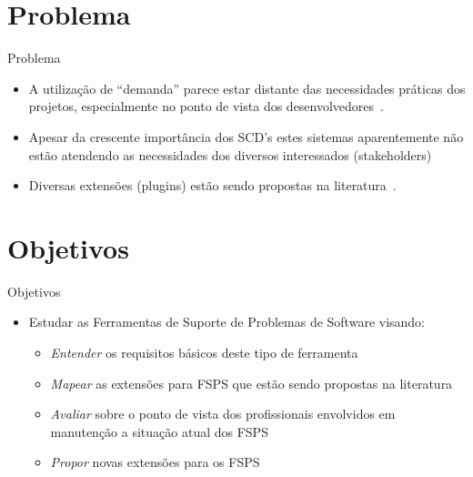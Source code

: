 \documentclass[t,14pt,mathserif]{beamer}
\begin{document}
\section{Problema}

\begin{frame}{Problema}
	\begin{itemize}
        \item A utilização de  ``demanda'' parece estar distante das
            necessidades práticas dos projetos, especialmente no ponto de vista
            dos desenvolvedores~\cite{Baysal:2013:SAP:2486788.2486957}.
        \item Apesar da crescente importância dos SCD's estes sistemas
            aparentemente não estão atendendo as necessidades dos diversos
            interessados (stakeholders)
        \item Diversas extensões (plugins) estão sendo propostas na
            literatura~\cite{101186,Thung:2014:BIT:2635868.2661678,Kononenko:2014:DED:2591062.2591075}.
	\end{itemize}
\end{frame}

\section{Objetivos}

\begin{frame}{Objetivos}
	\begin{itemize}
        \item Estudar as Ferramentas de Suporte de Problemas de Software
            visando:
			\begin{itemize}
				\item \textit{Entender} os requisitos básicos deste tipo de ferramenta
                \item \textit{Mapear} as extensões para FSPS que estão sendo
                    propostas na literatura
                \item \textit{Avaliar} sobre o ponto de vista dos profissionais
                    envolvidos em manutenção  a situação atual dos FSPS
				\item \textit{Propor} novas extensões para os FSPS
			\end{itemize}
	\end{itemize}
\end{frame}
\end{document}
